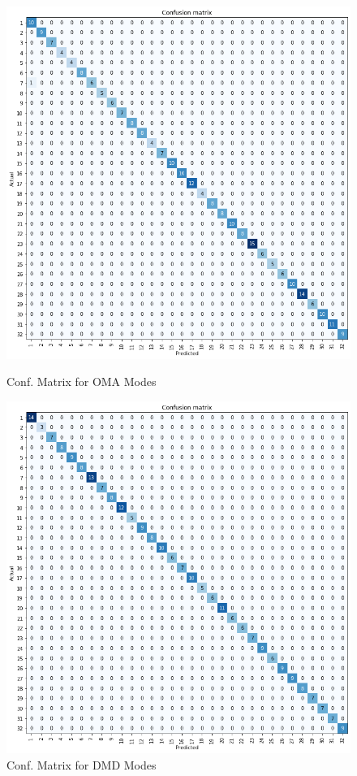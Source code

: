 \begin{figure}[h!]
    \centering
    \begin{minipage}{0.45\textwidth}
        \centering
        \includegraphics[scale=0.32]{../../../figures/conf_mat_OMA.png} %
        \caption{Conf. Matrix for OMA Modes}
        \label{fig:OMA}
    \end{minipage}\hfill
    \begin{minipage}{0.45\textwidth}
        \centering
        \includegraphics[scale=0.32]{../../../figures/conf_mat_DMD.png} %
        \caption{Conf. Matrix for DMD Modes}
        \label{fig:DMD}
    \end{minipage}
\end{figure}

